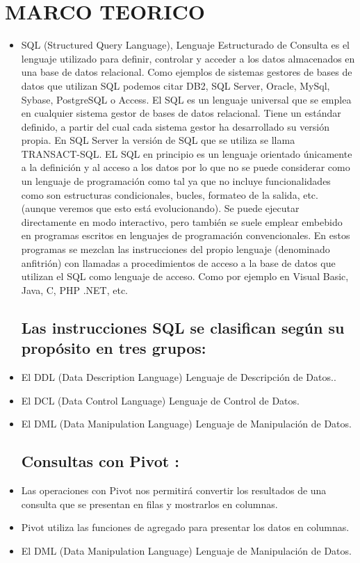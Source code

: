 \section{MARCO TEORICO} 
\begin{itemize}
\subsection{Base de datos TSQL:}
	\item SQL (Structured Query Language), Lenguaje Estructurado de Consulta es el lenguaje utilizado para definir, controlar y acceder a los datos almacenados en una base de datos relacional.
Como ejemplos de sistemas gestores de bases de datos que utilizan SQL podemos citar DB2, SQL Server, Oracle, MySql, Sybase, PostgreSQL o Access.
El SQL es un lenguaje universal que se emplea en cualquier sistema gestor de bases de datos relacional. Tiene un estándar definido, a partir del cual cada sistema gestor ha desarrollado su versión propia. 
En SQL Server la versión de SQL que se utiliza se llama TRANSACT-SQL.
EL SQL en principio es un lenguaje orientado únicamente a la definición y al acceso a los datos por lo que no se puede considerar como un lenguaje de programación como tal ya que no incluye funcionalidades como son estructuras condicionales, bucles, formateo de la salida, etc. (aunque veremos que esto está evolucionando).
Se puede ejecutar directamente en modo interactivo, pero también se suele emplear embebido en programas escritos en lenguajes de programación convencionales. En estos programas se mezclan las instrucciones del propio lenguaje (denominado anfitrión) con llamadas a procedimientos de acceso a la base de datos que utilizan el SQL como lenguaje de acceso. Como por ejemplo en Visual Basic, Java, C, PHP .NET, etc.

\subsection{Las instrucciones SQL se clasifican según su propósito en tres grupos:}
	\item El DDL (Data Description Language) Lenguaje de Descripción de Datos..
	\item El DCL (Data Control Language) Lenguaje de Control de Datos.
	\item El DML (Data Manipulation Language) Lenguaje de Manipulación de Datos.

\subsection{Consultas con Pivot :}
	\item Las operaciones con Pivot nos permitirá convertir los resultados de una consulta que se presentan en filas y mostrarlos en columnas.
	\item Pivot utiliza las funciones de agregado para presentar los datos en columnas.
	\item El DML (Data Manipulation Language) Lenguaje de Manipulación de Datos.


\end{itemize}
